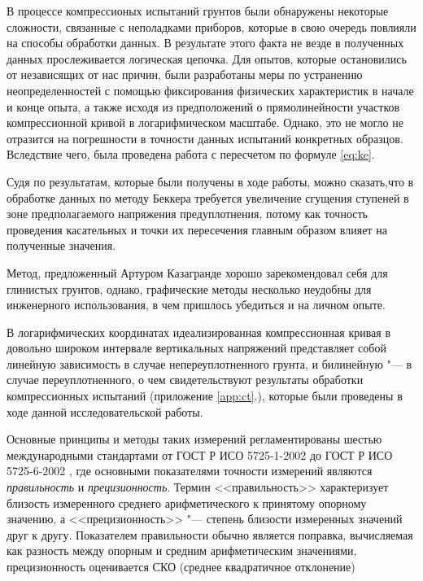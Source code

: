 В процессе компрессионых испытаний грунтов были обнаружены некоторые сложности, связанные с неполадками приборов, которые в свою очередь повлияли на способы обработки данных. В результате этого факта не везде в полученных данных прослеживается логическая цепочка. Для опытов, которые остановились от независящих от нас причин, были разработаны меры по устранению неопределенностей с помощью фиксирования физических характеристик в начале и конце опыта, а также исходя из предположений о прямолинейности участков компрессионной кривой в логарифмическом масштабе. Однако, это не могло не отразится на погрешности в точности данных испытаний конкретных образцов. 
Вследствие чего, была проведена работа с пересчетом по формуле \ref{eq:ke}.

Судя по результатам, которые были получены в ходе работы, можно сказать,что в обработке данных по методу Беккера требуется увеличение сгущения ступеней в зоне предполагаемого напряжения предуплотнения, потому как точность проведения касательных и точки их пересечения главным образом влияет на полученные значения.

Метод, предложенный Артуром Казагранде хорошо зарекомендовал себя для глинистых грунтов, однако, графические методы несколько неудобны для инженерного использования, в чем пришлось убедиться и на личном опыте.

В логарифмических координатах идеализированная компрессионная кривая в довольно широком интервале вертикальных напряжений представляет собой линейную зависимость в случае непереуплотненного грунта, и билинейную "--- в случае переуплотненного, о чем свидетельствуют результаты обработки компрессионных испытаний (приложение \ref{app:ct}.), которые были проведены в ходе данной исследовательской работы. 
%
%

Основные принципы и методы таких измерений регламентированы шестью международными стандартами от ГОСТ Р ИСО 5725-1-2002 до ГОСТ Р ИСО 5725-6-2002 \cite{gost5725}, где основными показателями точности измерений являются \textit{правильность} и \textit{прецизионность}. Термин <<правильность>> характеризует близость измеренного среднего арифметического к принятому опорному значению, а <<прецизионность>> "--- степень близости измеренных значений друг к другу.
Показателем правильности обычно является поправка, вычисляемая как разность между опорным и средним арифметическим значениями, прецизионность оценивается СКО (среднее квадратичное отклонение) %

